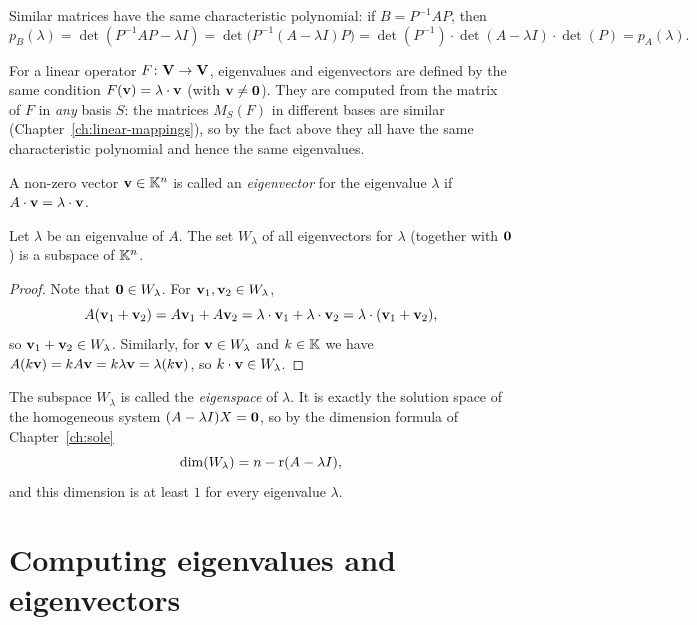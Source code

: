 \begin{fact}
Similar matrices have the same characteristic polynomial: if $B = P^{-1}AP$, then
\[
p_B(\lambda) = \det(P^{-1}AP - \lambda I) = \det\big(P^{-1}(A-\lambda I)P\big)
= \det(P^{-1})\cdot\det(A-\lambda I)\cdot\det(P) = p_A(\lambda).
\]
\end{fact}

\begin{remark}
For a linear operator $F\colon\mathbf{V}\to\mathbf{V}$, eigenvalues and eigenvectors are defined by the same condition
$F(\mathbf{v}) = \lambda\cdot\mathbf{v}$ (with $\mathbf{v}\neq\mathbf{0}$). They are computed from the matrix of $F$ in \emph{any}
basis $S$: the matrices $M_S(F)$ in different bases are similar (Chapter~\ref{ch:linear-mappings}), so by
the fact above they all have the same characteristic polynomial and hence the same eigenvalues.
\end{remark}

\begin{definition}
A non-zero vector $\mathbf{v}\in \mathbb{K}^n$ is called an \emph{eigenvector} for the eigenvalue $\lambda$ if
$A\cdot \mathbf{v} = \lambda \cdot \mathbf{v}$.
\end{definition}

\begin{theorem}
Let $\lambda$ be an eigenvalue of $A$. The set $W_\lambda$ of all eigenvectors for $\lambda$ (together with
$\mathbf{0}$) is a subspace of $\mathbb{K}^n$.
\end{theorem}

\begin{proof}
Note that $\mathbf{0}\in W_\lambda$. For $\mathbf{v}_1,\mathbf{v}_2\in W_\lambda$,
\[
A(\mathbf{v}_1+\mathbf{v}_2)=A\mathbf{v}_1+A\mathbf{v}_2=\lambda\cdot \mathbf{v}_1+\lambda\cdot \mathbf{v}_2 = \lambda \cdot (\mathbf{v}_1+\mathbf{v}_2),
\]
so $\mathbf{v}_1+\mathbf{v}_2\in W_\lambda$. Similarly, for $\mathbf{v}\in W_\lambda$ and $k\in \mathbb{K}$ we have
$A(k\mathbf{v})=kA\mathbf{v}=k\lambda\mathbf{v}=\lambda(k\mathbf{v})$, so $k\cdot \mathbf{v}\in W_\lambda$.
\end{proof}

\begin{remark}
The subspace $W_\lambda$ is called the \emph{eigenspace} of $\lambda$. It is exactly the solution space of
the homogeneous system $(A-\lambda I)X = \mathbf{0}$, so by the dimension formula of Chapter~\ref{ch:sole}
\[
\dim(W_\lambda) = n - \operatorname{r}(A-\lambda I),
\]
and this dimension is at least $1$ for every eigenvalue $\lambda$.
\end{remark}

\section{Computing eigenvalues and eigenvectors}

